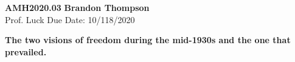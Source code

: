 \noindent
\textbf{AMH2020.03} \hfill \textbf{Brandon Thompson} \\
\normalsize Prof. Luck \hfill Due Date: 10/118/2020 \\

\begin{center}
\textbf{The two visions of freedom during the mid-1930s and the one that prevailed.}
\end{center}